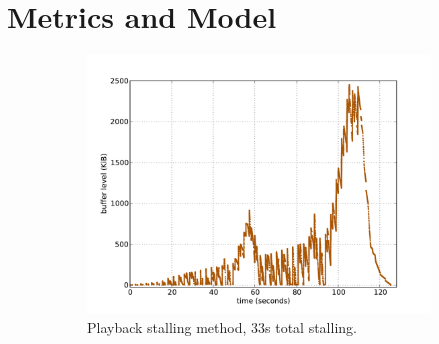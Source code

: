 \section{Metrics and Model}
\label{sec:metricsmodel}

\begin{figure}[htbp]
        \centering
        \begin{subfigure}[b]{0.50\textwidth}
                \centering
                \includegraphics[width=\textwidth]{images/bufferlevel-stall-new.pdf}
                \caption{Playback stalling method, 33s total stalling.}
                \label{c3:fig:bufferlevel-stall}
        \end{subfigure}%
        ~
        \begin{subfigure}[b]{0.50\textwidth}
                \centering

\end{subfigure}
\end{figure}
